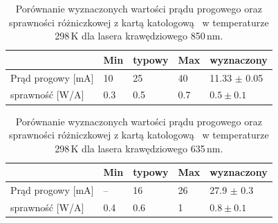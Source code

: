 \begin{table}
\begin{center}
\label{tab:tabela3}
\caption{Porównanie wyznaczonych wartości prądu progowego oraz sprawności różniczkowej z kartą katologową~\cite{spec_edge_850}
 w temperaturze 298\,K dla lasera krawędziowego 850\,nm. }
\begin{tabular}{ | C{3.5cm}|  C{1.5cm} | C{1.5cm} | C{1.5cm}| C{3.5cm}|}
\hline
         &   Min  & typowy & Max   & wyznaczony        \\ \hline
Prąd progowy [mA] &  10    &  25    & 40    & 11.33 $\pm$ 0.05  \\ \hline
sprawność [W/A]     &  0.3   &  0.5   & 0.7   & $0.5 \pm 0.1$     \\ \hline
\end{tabular}
\end{center}
\end{table}
\begin{table}
\begin{center}
\label{tab:tabela4}
\caption{Porównanie wyznaczonych wartości prądu progowego oraz sprawności różniczkowej z kartą katologową~\cite{spec_edge_635}
 w temperaturze 298\,K dla lasera krawędziowego 635\,nm. }
\begin{tabular}{ | C{3.5cm}|  C{1.5cm} | C{1.5cm} | C{1.5cm}| C{3.5cm}|}
\hline
        &   Min  & typowy & Max   & wyznaczony        \\ \hline
Prąd progowy [mA] &  --    &  16    & 26    & 27.9 $\pm$ 0.3  \\ \hline
sprawność [W/A]      &  0.4   &  0.6   & 1  &  $0.8 \pm 0.1$       \\ \hline
\end{tabular}
\end{center}
\end{table}


